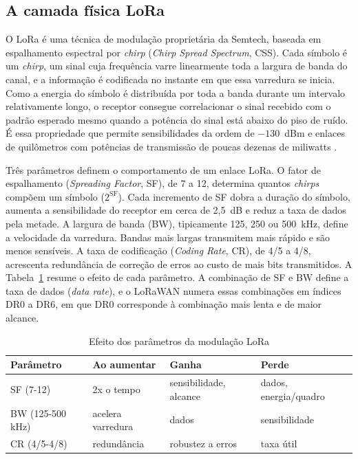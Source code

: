 \subsection{A camada física LoRa}
\label{subsec:camada_fisica_lora}

O LoRa é uma técnica de modulação proprietária da Semtech, baseada em espalhamento espectral por \textit{chirp} (\textit{Chirp Spread Spectrum}, CSS). Cada símbolo é um \textit{chirp}, um sinal cuja frequência varre linearmente toda a largura de banda do canal, e a informação é codificada no instante em que essa varredura se inicia. Como a energia do símbolo é distribuída por toda a banda durante um intervalo relativamente longo, o receptor consegue correlacionar o sinal recebido com o padrão esperado mesmo quando a potência do sinal está abaixo do piso de ruído. É essa propriedade que permite sensibilidades da ordem de $-130$~dBm e enlaces de quilômetros com potências de transmissão de poucas dezenas de miliwatts \cite{semtech2015sx1276}.

Três parâmetros definem o comportamento de um enlace LoRa. O fator de espalhamento (\textit{Spreading Factor}, SF), de 7 a 12, determina quantos \textit{chirps} compõem um símbolo ($2^{\mathrm{SF}}$). Cada incremento de SF dobra a duração do símbolo, aumenta a sensibilidade do receptor em cerca de 2,5~dB e reduz a taxa de dados pela metade. A largura de banda (BW), tipicamente 125, 250 ou 500~kHz, define a velocidade da varredura. Bandas mais largas transmitem mais rápido e são menos sensíveis. A taxa de codificação (\textit{Coding Rate}, CR), de 4/5 a 4/8, acrescenta redundância de correção de erros ao custo de mais bits transmitidos. A Tabela~\ref{tab:parametros_lora} resume o efeito de cada parâmetro. A combinação de SF e BW define a taxa de dados (\textit{data rate}), e o LoRaWAN numera essas combinações em índices DR0 a DR6, em que DR0 corresponde à combinação mais lenta e de maior alcance.

\begin{table}[htb]
\centering
\caption{Efeito dos parâmetros da modulação LoRa}
\label{tab:parametros_lora}
\begin{tabular}{llll}
\hline
\textbf{Parâmetro} & \textbf{Ao aumentar} & \textbf{Ganha} & \textbf{Perde} \\
\hline
SF (7-12)   & 2x o tempo & sensibilidade, alcance & dados, energia/quadro \\
BW (125-500 kHz) & acelera varredura & dados & sensibilidade \\
CR (4/5-4/8) & redundância & robustez a erros & taxa útil \\
\hline
\end{tabular}
\end{table}

